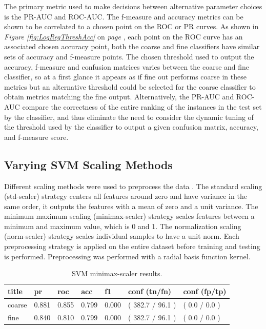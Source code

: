 \documentclass[ms]{nuthesis}
\begin{document}
\par The primary metric used to make decisions between alternative parameter choices is the PR-AUC and
ROC-AUC. The f-measure and accuracy metrics can be shown to be correlated to a chosen point on the ROC or
PR curves. As shown in \textit{Figure \ref{fig:LogRegThreshAcc}} on \textit{page \pageref{fig:LogRegThreshAcc}},
each point on the ROC curve has an associated chosen accuracy point, both the coarse and fine classifiers have similar
sets of accuracy and f-measure points. The chosen threshold used to output the accuracy, f-measure and confusion matrices
varies between the coarse and fine classifier, so at a first glance it appears as if fine out performs coarse in these
metrics but an alternative threshold could be selected for the coarse classifier to obtain metrics matching the fine
output. Alternatively, the PR-AUC and ROC-AUC compare the correctness of the entire ranking of the
instances in the test set by the classifier, and thus eliminate the need to consider the dynamic tuning of the threshold
used by the classifier to output a given confusion matrix, accuracy, and f-measure score.



\subsection{Varying SVM Scaling Methods}
\par Different scaling methods were used to preprocess the data \cite{scikit-learn}. The standard scaling (std-scaler) strategy
centers all features around zero and have variance in the same order, it outputs the features with a mean of zero
and a unit variance. The minimum maximum scaling (minimax-scaler) strategy scales features between a minimum and maximum value,
which is 0 and 1. The normalization scaling (norm-scaler) strategy scales individual samples to have a unit norm. Each
preprocessing strategy is applied on the entire dataset before training and testing is performed. Preprocessing was performed
with a radial basis function kernel.

\FloatBarrier

\begin{table}[H]
\centering
\caption{SVM minimax-scaler results.}
\label{tab:SVMMinMax}
\begin{tabular}{|l||l||l||l||l||l||l|}\toprule
title & pr & roc & acc & f1 & conf (tn/fn) & conf (fp/tp) \\ \midrule
coarse & 0.881 & 0.855 & 0.799 & 0.000 & ( 382.7 / 96.1 ) & ( 0.0 / 0.0 ) \\
fine & 0.840 & 0.810 & 0.799 & 0.000 & ( 382.7 / 96.1 ) & ( 0.0 / 0.0 ) \\ \bottomrule
\end{tabular}
\end{table}
\FloatBarrier
\end{document}
